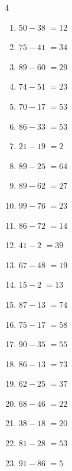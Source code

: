 \begin{multicols}{4}
\begin{enumerate}
  \item $50-38$
        $=12$

  \item $75-41$
        $=34$

  \item $89-60$
        $=29$

  \item $74-51$
        $=23$

  \item $70-17$
        $=53$

  \item $86-33$
        $=53$

  \item $21-19$
        $=2$

  \item $89-25$
        $=64$

  \item $89-62$
        $=27$

  \item $99-76$
        $=23$

  \item $86-72$
        $=14$

  \item $41-2$
        $=39$

  \item $67-48$
        $=19$

  \item $15-2$
        $=13$

\columnbreak %

\resetques

  \item $87-13$
        $=74$

  \item $75-17$
        $=58$

  \item $90-35$
        $=55$

  \item $86-13$
        $=73$

  \item $62-25$
        $=37$

  \item $68-46$
        $=22$

  \item $38-18$
        $=20$

  \item $81-28$
        $=53$

  \item $91-86$
        $=5$


\end{enumerate}
\end{multicols}
